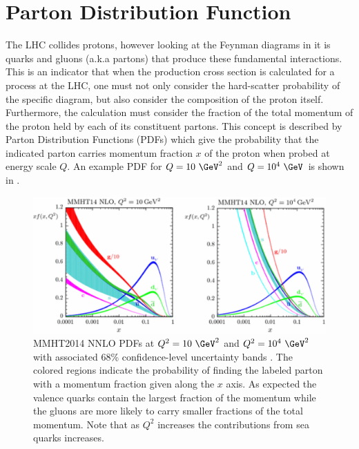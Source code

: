 \section{Parton Distribution Function} \label{sec:higgs:partons}

The LHC collides protons, however looking at the Feynman diagrams in
 it is quarks and gluons (a.k.a partons) that
produce these fundamental interactions. This is an indicator that when the
production cross section is calculated for a process at the LHC, one must not
only consider the hard-scatter probability of the specific diagram, but also
consider the composition of the proton itself.  Furthermore, the calculation
must consider the fraction of the total momentum of the proton held by each of
its constituent partons.  This concept is described by Parton Distribution
Functions (PDFs) which give the probability that the indicated parton carries
momentum fraction $x$ of the proton when probed at energy scale $Q$.  An
example PDF for $Q = 10~\GeV^2$ and $Q = 10^{4}~\GeV$ is shown in
.

\begin{figure}[!htbp]
  \begin{center}
    \includegraphics[width=0.8\linewidth]{figures/higgs/pdf.pdf}
    \caption{MMHT2014 NNLO PDFs at $Q^2 = 10~\GeV^{2}$ and $Q^2
=10^{4}~\GeV^{2}$ with associated 68\% confidence-level uncertainty bands
\cite{Harland-Lang2015}.  The colored regions indicate the probability of
finding the labeled parton with a momentum fraction given along the $x$ axis.
As expected the valence quarks contain the largest fraction of the momentum
while the gluons are more likely to carry smaller fractions of the total
momentum.  Note that as $Q^2$ increases the contributions from sea quarks
increases.}
    \label{fig:parton_distribution_function}
  \end{center}
\end{figure}
